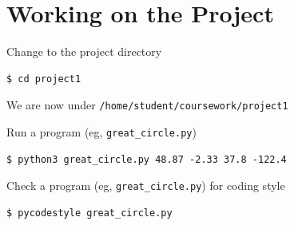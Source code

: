 \documentclass[8pt,a4paper,compress]{beamer}
\begin{document}
\section{Working on the Project}
\begin{frame}[fragile]
\pause\transdissolve

Change to the project directory

\begin{tcolorbox}[enhanced,drop shadow southwest,sharp corners,size=fbox,colback=black]
\begin{lstlisting}[style=terminal]
$ cd project1
\end{lstlisting}
\end{tcolorbox}

\pause\transdissolve\bigskip

We are now under \lstinline{/home/student/coursework/project1}

\pause\transdissolve\bigskip

Run a program (eg, \lstinline{great_circle.py})

\begin{tcolorbox}[enhanced,drop shadow southwest,sharp corners,size=fbox,colback=black]
\begin{lstlisting}[style=terminal]
$ python3 great_circle.py 48.87 -2.33 37.8 -122.4
\end{lstlisting}
\end{tcolorbox}

\pause\transdissolve\bigskip

Check a program (eg, \lstinline{great_circle.py}) for coding style

\begin{tcolorbox}[enhanced,drop shadow southwest,sharp corners,size=fbox,colback=black]
\begin{lstlisting}[style=terminal]
$ pycodestyle great_circle.py
\end{lstlisting}
\end{tcolorbox}
\end{frame}
\end{document}
